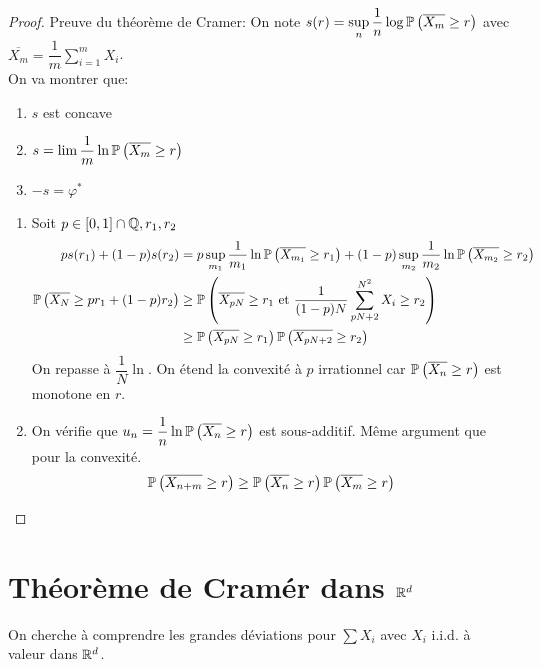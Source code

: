 \documentclass[]{report}
\begin{document}
    \begin{proof}
        Preuve du théorème de Cramer: On note $\displaystyle{s(r)=\sup_n \dfrac{1}{n}\log \mathbb{P}\left(\overline{X_m}\ge r\right)}$ avec $\displaystyle{\overline{X_m}=\dfrac{1}{m}\sum_{i=1}^{m}X_i}$.\\
        On va montrer que:
        \begin{enumerate}
            \item $s$ est concave
            \item $s=\lim \dfrac{1}{m}\ln \mathbb{P}\left(\overline{X_m}\ge r\right)$
            \item $-s=\varphi^*$
        \end{enumerate}
        \vspace{0.5cm}
        \begin{enumerate}
            \item Soit $p\in [0,1]\cap \mathbb{Q},r_1,r_2$
            \begin{align*}
                ps(r_1)+(1-p) s(r_2)&=p\sup_{m_1}\dfrac{1}{m_1} \ln \mathbb{P}\left( \overline{X_{m_1}}\ge r_1\right)+(1-p)\sup_{m_2}\dfrac{1}{m_2}\ln \mathbb{P}\left(\overline{X_{m_2}}\ge r_2\right)\\
                \mathbb{P}\left(\overline{X_N}\ge pr_1 +(1-p)r_2\right)&\ge \mathbb{P}\left(\overline{X_{pN}}\ge r_1\text{ et }\dfrac{1}{(1-p)N} \sum_{pN+2}^{N^2} X_i \ge r_2\right)\\
                &\ge \mathbb{P} \left( \overline{X_{pN}}\ge r_1\right)\mathbb{P}\left(\overline{X_{pN+2}}\ge r_2\right)
            \end{align*}
            On repasse à $\dfrac{1}{N}\ln$. On étend la convexité à $p$ irrationnel car $\mathbb{P} \left(\overline{X_n}\ge r\right)$ est monotone en $r$.
            \item On vérifie que $u_n=\dfrac{1}{n}\ln \mathbb{P}\left(\overline{X_n}\ge r\right)$ est sous-additif. Même argument que pour la convexité.
            \[\mathbb{P}\left(\overline{X_{n+m}}\ge r\right)\ge \mathbb{P}\left(\overline{X_n}\ge r\right)\mathbb{P}\left(\overline{X_m}\ge r\right)\]
        \end{enumerate}
    \end{proof}

    \section{Théorème de Cramér dans $\mathbb{R}^d$}

    On cherche à comprendre les grandes déviations pour $\sum X_i$ avec $X_i$ i.i.d. à valeur dans $\mathbb{R}^d$.
\end{document}

